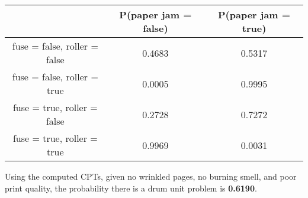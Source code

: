 \begin{table}[h!]
	\begin{tabular}{|c|c|c|}
		\hline
		& P(paper jam = false) & P(paper jam = true) \\ \hline
		fuse = false, roller = false & 0.4683 & 0.5317 \\ \hline
		fuse = false, roller = true & 0.0005 & 0.9995 \\ \hline
		fuse = true, roller = false & 0.2728 & 0.7272 \\ \hline
		fuse = true, roller = true & 0.9969 & 0.0031 \\ \hline
	\end{tabular}
\end{table}

\pagebreak Using the computed CPTs, given no wrinkled pages, no burning smell, and poor print quality, the probability there is a drum unit problem is \textbf{0.6190}.